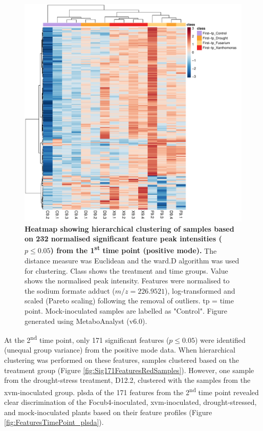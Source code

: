 \begin{figure}[p!]
  \centering
  \includegraphics[width=\textwidth]{Figures/Sig232Features_heatmap_9_dpi72-ForThesis.pdf}
  \caption[Heatmap showing hierarchical clustering of samples based on 232 normalised significant feature peak intensities ($p \le0.05$) from the 1\textsuperscript{st} time point (positive mode).]{\textbf{Heatmap showing hierarchical clustering of samples based on 232 normalised significant feature peak intensities ($p \le0.05$) from the 1\textsuperscript{st} time point (positive mode).} The distance measure was Euclidean and the ward.D algorithm was used for clustering. Class shows the treatment and time groups. Value shows the normalised peak intensity. Features were normalised to the sodium formate   adduct ($m/z=226.9521$), log-transformed and scaled (Pareto scaling) following the removal of outliers. tp = time point. Mock-inoculated samples are labelled as "Control". Figure generated using MetaboAnalyst (v6.0).}
  \label{fig:Sig232FeaturesRedSamples}
\end{figure}

At the 2\textsuperscript{nd} time point, only 171 significant features ($p \le0.05$) were identified (unequal group variance) from the positive mode data. When hierarchical clustering was performed on these features, samples clustered based on the treatment group (Figure \ref{fig:Sig171FeaturesRedSamples}). However, one sample from the drought-stress treatment, D12.2, clustered with the samples from the \ac{xvm}-inoculated group. \Ac{plsda} of the 171 features from the 2\textsuperscript{nd} time point revealed clear discrimination of the \ac{Focub4}-inoculated, \ac{xvm}-inoculated, drought-stressed, and mock-inoculated plants based on their feature profiles (Figure \ref{fig:FeaturesTimePoint_plsda}). 

